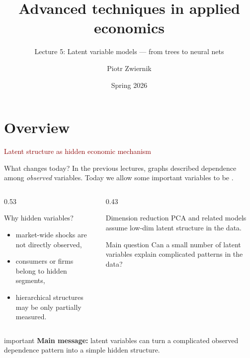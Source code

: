 \documentclass[dvipsnames,aspectratio=169,handout]{beamer}
\title{Advanced techniques in applied economics}
\subtitle{Lecture 5: Latent variable models --- from trees to neural nets}
\author{Piotr Zwiernik}
\date{Spring 2026}
\begin{document}

\begin{frame}
\titlepage
\end{frame}


\section{Overview}

\begin{frame}{}
\begin{center}
{\huge \textcolor{DarkRed}{Latent structure as hidden economic mechanism}}
\end{center}
\end{frame}

\begin{frame}{What changes today?}
In the previous lectures, graphs described dependence among \emph{observed} variables.
Today we allow some important variables to be .

\begin{columns}[T]
\begin{column}{0.53\textwidth}
\begin{block}{Why hidden variables?}
\begin{itemize}
    \item market-wide shocks are not directly observed,
    \item consumers or firms belong to hidden segments,
    \item hierarchical structures may be only partially measured.
\end{itemize}
\end{block}
\end{column}
\begin{column}{0.43\textwidth}
\begin{alertblock}{Dimension reduction}
	PCA and related models assume low-dim latent structure in the data.
\end{alertblock}
\begin{block}{Main question}
\vspace{-1mm}
Can a small number of latent variables explain complicated patterns in the data?
\end{block}
\end{column}
\end{columns}

\begin{beamercolorbox}[wd=\textwidth,sep=8pt,center,rounded=true,shadow=true]{important}
\textbf{Main message:}
latent variables can turn a complicated observed dependence pattern into a simple hidden structure.
\end{beamercolorbox}
\end{frame}
\end{document}
